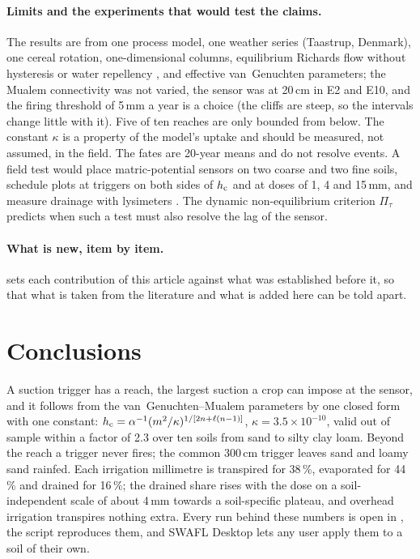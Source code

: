 \paragraph{Limits and the experiments that would test the claims.}
The results are from one process model, one weather series (Taastrup, Denmark), one cereal rotation, one-dimensional columns, equilibrium Richards flow without hysteresis or water repellency \citep{Elmaloglou2009b,Diamantopoulos2013AWR,Diamantopoulos2013JH}, and effective van~Genuchten parameters; the Mualem connectivity was not varied, the sensor was at 20\,cm in E2 and E10, and the firing threshold of 5\,mm a year is a choice (the cliffs are steep, so the intervals change little with it). Five of ten reaches are only bounded from below. The constant $\kappa$ is a property of the model's uptake and should be measured, not assumed, in the field. The fates are 20-year means and do not resolve events. A field test would place matric-potential sensors on two coarse and two fine soils, schedule plots at triggers on both sides of $h_{\mathrm{c}}$ and at doses of 1, 4 and 15\,mm, and measure drainage with lysimeters \citep{Groh2020}. The dynamic non-equilibrium criterion $\Pi_\tau$ predicts when such a test must also resolve the lag of the sensor.

\paragraph{What is new, item by item.}  sets each contribution of this article against what was established before it, so that what is taken from the literature and what is added here can be told apart.


\section{Conclusions}
A suction trigger has a reach, the largest suction a crop can impose at the sensor, and it follows from the van~Genuchten--Mualem parameters by one closed form with one constant: $h_{\mathrm{c}}=\alpha^{-1}(m^{2}/\kappa)^{1/[2n+\ell(n-1)]}$, $\kappa=3.5\times10^{-10}$, valid out of sample within a factor of 2.3 over ten soils from sand to silty clay loam. Beyond the reach a trigger never fires; the common 300\,cm trigger leaves sand and loamy sand rainfed. Each irrigation millimetre is transpired for 38\,\%, evaporated for 44\,\% and drained for 16\,\%; the drained share rises with the dose on a soil-independent scale of about 4\,mm towards a soil-specific plateau, and overhead irrigation transpires nothing extra. Every run behind these numbers is open in \cslink{}, the script reproduces them, and SWAFL Desktop lets any user apply them to a soil of their own.

